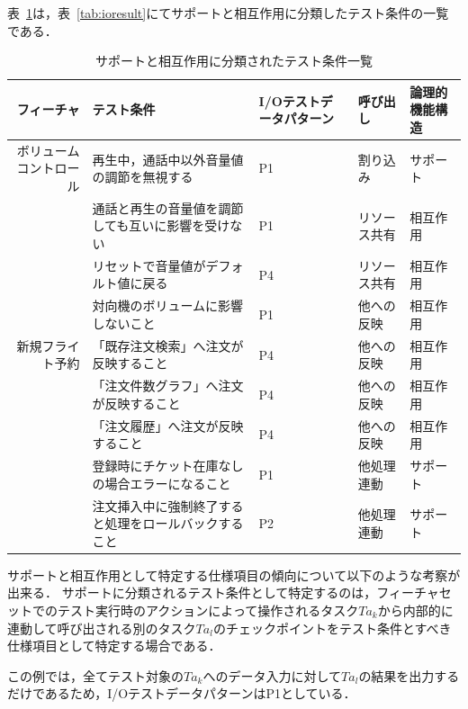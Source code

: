 表~\ref{tab:D-4-SandI}は，表~\ref{tab:ioresult}にてサポートと相互作用に分類したテスト条件の一覧である．

\begin{table}[htbp]
  \centering
  \caption{サポートと相互作用に分類されたテスト条件一覧}
    \begin{tabular}{|r|p{8em}|p{4em}|p{4em}|p{5em}|}
    \hline
    \multicolumn{1}{|p{4em}|}{フィーチャ} & テスト条件 & I/Oテストデータパターン & 呼び出し & 論理的機能構造 \bigstrut\\
    \hline
    \multicolumn{1}{|p{4em}|}{ボリュームコントロール} & 再生中，通話中以外音量値の調節を無視する & P1　   & 割り込み  & サポート \bigstrut\\
\cline{2-5}          & 通話と再生の音量値を調節しても互いに影響を受けない & P1    & リソース共有 & 相互作用 \bigstrut\\
\cline{2-5}          & リセットで音量値がデフォルト値に戻る & P4　　  & リソース共有 & 相互作用 \bigstrut\\
    \cline{2-5}          & 対向機のボリュームに影響しないこと & P1　　  &  他への反映 & 相互作用 \bigstrut\\
    \hline
    \multicolumn{1}{|p{4em}|}{新規フライト予約} & 「既存注文検索」へ注文が反映すること & P4　   & 他への反映 & 相互作用 \bigstrut\\
\cline{2-5}          & 「注文件数グラフ」へ注文が反映すること & P4　   & 他への反映 & 相互作用 \bigstrut\\
\cline{2-5}          & 「注文履歴」へ注文が反映すること & P4    & 他への反映 & 相互作用 \bigstrut\\
\cline{2-5}          & 登録時にチケット在庫なしの場合エラーになること & P1    & 他処理連動 & サポート \bigstrut\\
\cline{2-5}          & 注文挿入中に強制終了すると処理をロールバックすること & P2    & 他処理連動 & サポート \bigstrut\\
    \hline
    \end{tabular}%
  \label{tab:D-4-SandI}%
\end{table}%

サポートと相互作用として特定する仕様項目の傾向について以下のような考察が出来る．
サポートに分類されるテスト条件として特定するのは，フィーチャセットでのテスト実行時のアクションによって操作されるタスク$Ta_k$から内部的に連動して呼び出される別のタスク$Ta_l$のチェックポイントをテスト条件とすべき仕様項目として特定する場合である．

この例では，全てテスト対象の$Ta_k$へのデータ入力に対して$Ta_l$の結果を出力するだけであるため，I/OテストデータパターンはP1としている．


